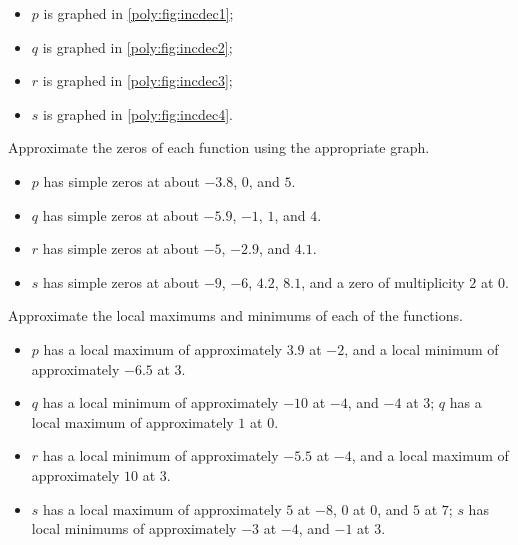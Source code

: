 \begin{exercises}
\begin{problem}
\begin{subproblem}
\begin{shortsolution}
		\begin{itemize}
			\item $p$ is graphed in \vref{poly:fig:incdec1};
			\item $q$ is graphed in \vref{poly:fig:incdec2};
			\item $r$ is graphed in \vref{poly:fig:incdec3};
			\item $s$ is graphed in \vref{poly:fig:incdec4}.
		\end{itemize}
	\end{shortsolution}
\end{subproblem}
\begin{subproblem}
	Approximate the zeros of each function using the appropriate graph.
	\begin{shortsolution}
		\begin{itemize}
			\item $p$ has simple zeros at about $-3.8$, $0$, and $5$.
			\item $q$ has simple zeros at about $-5.9$, $-1$, $1$, and $4$.
			\item $r$ has simple zeros at about $-5$, $-2.9$, and $4.1$.
			\item $s$ has simple zeros at about $-9$, $-6$, $4.2$, $8.1$, and a zero of multiplicity $2$ at $0$.
		\end{itemize}
	\end{shortsolution}
\end{subproblem}
\begin{subproblem}
	Approximate the local maximums and minimums of each of the functions.
	\begin{shortsolution}
		\begin{itemize}
			\item $p$ has a local maximum of approximately $3.9$ at $-2$, and a local minimum of approximately $-6.5$ at $3$.
			\item $q$ has a local minimum of approximately $-10$ at $-4$, and $-4$ at $3$; $q$ has a local maximum of approximately $1$ at $0$.
			\item $r$ has a local minimum of approximately $-5.5$ at $-4$, and a local maximum of approximately $10$ at $3$.
			\item $s$ has a local maximum of approximately $5$ at $-8$, $0$ at $0$, and $5$ at  $7$; $s$ has local minimums
			      of approximately $-3$ at $-4$, and $-1$ at $3$.
		\end{itemize}
	\end{shortsolution}
\end{subproblem}

\end{problem}
\end{exercises}
